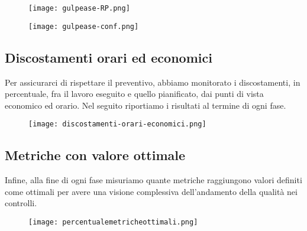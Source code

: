 \documentclass[../piano-di-qualifica.tex]{subfiles}
\begin{document}
\begin{figure}[H]
  \centering
  \texttt{[image: gulpease-RP.png]}%
\end{figure}


\begin{figure}[H]
  \centering
  \texttt{[image: gulpease-conf.png]}%
\end{figure}

\newpage

\subsection{Discostamenti orari ed economici}%
\label{sub:discostamenti_orari_ed_economici}
Per assicurarci di rispettare il preventivo, abbiamo monitorato i discostamenti, in percentuale, fra il lavoro eseguito e quello pianificato, dai punti di vista economico ed orario. Nel seguito riportiamo i risultati al termine di ogni fase.

\begin{figure}[H]
  \centering
  \texttt{[image: discostamenti-orari-economici.png]}%
\end{figure}

\subsection{Metriche con valore ottimale}%
\label{sub:metriche_ottimali}
Infine, alla fine di ogni fase misuriamo quante metriche raggiungono valori definiti come ottimali per avere una visione complessiva dell'andamento della qualità nei controlli.
\begin{figure}[H]
  \centering
  \texttt{[image: percentualemetricheottimali.png]}%
\end{figure}
\end{document}
